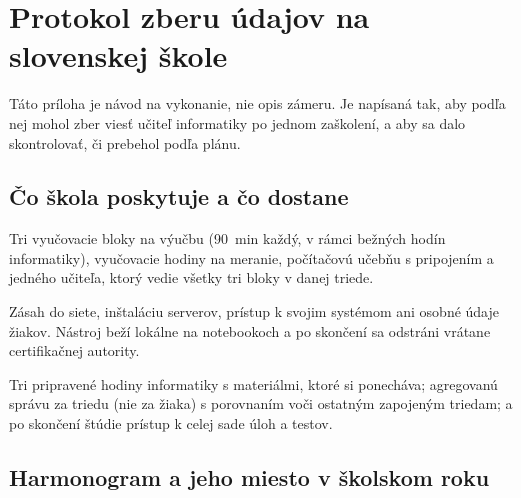 \chapter{Protokol zberu údajov na slovenskej škole}
\label{chapter:protokol}

Táto príloha je návod na vykonanie, nie opis zámeru. Je napísaná tak, aby podľa nej mohol zber viesť učiteľ informatiky po jednom zaškolení, a aby sa dalo skontrolovať, či prebehol podľa plánu.

\section{Čo škola poskytuje a čo dostane}

\begin{description}[leftmargin=0.6cm, nosep]
    \item[\textbf{Čo škola dáva.}] Tri vyučovacie bloky na výučbu (90~min každý, v rámci bežných hodín informatiky), \asmMeasureLessons{} vyučovacie hodiny na meranie, počítačovú učebňu s pripojením a jedného učiteľa, ktorý vedie všetky tri bloky v danej triede.
    \item[\textbf{Čo škola nedáva.}] Zásah do siete, inštaláciu serverov, prístup k svojim systémom ani osobné údaje žiakov. Nástroj beží lokálne na notebookoch a po skončení sa odstráni vrátane certifikačnej autority.
    \item[\textbf{Čo škola dostane.}] Tri pripravené hodiny informatiky s materiálmi, ktoré si ponecháva; agregovanú správu za triedu (nie za žiaka) s porovnaním voči ostatným zapojeným triedam; a po skončení štúdie prístup k celej sade úloh a testov.
\end{description}

\section{Harmonogram a jeho miesto v školskom roku}

